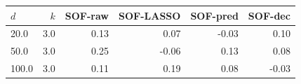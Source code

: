 \begin{tabular}{lrrrrr}
\toprule
$d$ & $k$ & SOF-raw & SOF-LASSO & SOF-pred & SOF-dec \\
\midrule
20.0 & 3.0 & 0.13 & 0.07 & -0.03 & 0.10 \\
50.0 & 3.0 & 0.25 & -0.06 & 0.13 & 0.08 \\
100.0 & 3.0 & 0.11 & 0.19 & 0.08 & -0.03 \\
\bottomrule
\end{tabular}
